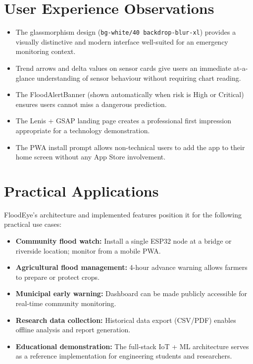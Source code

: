 \section{User Experience Observations}

\begin{itemize}[leftmargin=1.5em]
  \item The glassmorphism design (\texttt{bg-white/\allowbreak{}40 backdrop-blur-xl}) provides a visually distinctive and modern interface well-suited for an emergency monitoring context.
  \item Trend arrows and delta values on sensor cards give users an immediate at-a-glance understanding of sensor behaviour without requiring chart reading.
  \item The FloodAlertBanner (shown automatically when risk is High or Critical) ensures users cannot miss a dangerous prediction.
  \item The Lenis + GSAP landing page creates a professional first impression appropriate for a technology demonstration.
  \item The PWA install prompt allows non-technical users to add the app to their home screen without any App Store involvement.
\end{itemize}

\section{Practical Applications}

FloodEye's architecture and implemented features position it for the following practical use cases:

\begin{itemize}[leftmargin=1.5em]
  \item \textbf{Community flood watch:} Install a single ESP32 node at a bridge or riverside location; monitor from a mobile PWA.
  \item \textbf{Agricultural flood management:} 4-hour advance warning allows farmers to prepare or protect crops.
  \item \textbf{Municipal early warning:} Dashboard can be made publicly accessible for real-time community monitoring.
  \item \textbf{Research data collection:} Historical data export (CSV/PDF) enables offline analysis and report generation.
  \item \textbf{Educational demonstration:} The full-stack IoT + ML architecture serves as a reference implementation for engineering students and researchers.
\end{itemize}
